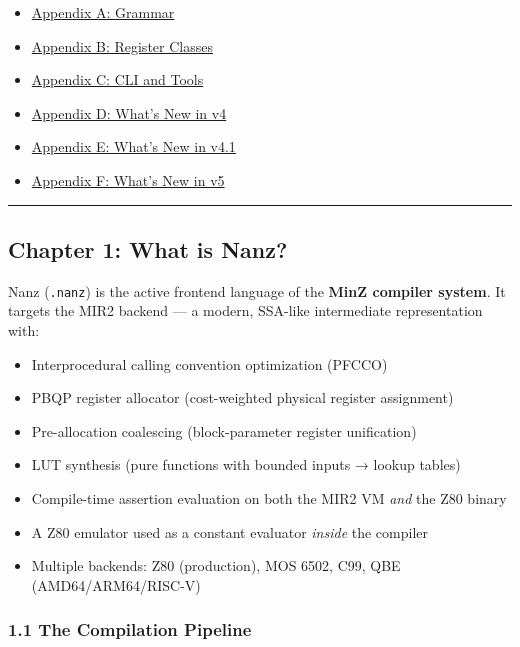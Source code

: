 \documentclass[
  11pt,
]{article}
\providecommand{\tightlist}{%
  \setlength{\itemsep}{0pt}\setlength{\parskip}{0pt}}
\begin{document}
\begin{itemize}
\tightlist
\item
  \protect\hyperlink{appendix-a-grammar}{Appendix A: Grammar}
\item
  \protect\hyperlink{appendix-b-register-classes}{Appendix B: Register
  Classes}
\item
  \protect\hyperlink{appendix-c-cli-and-tools}{Appendix C: CLI and
  Tools}
\item
  \protect\hyperlink{appendix-d-whats-new-in-v4}{Appendix D: What's New
  in v4}
\item
  \protect\hyperlink{appendix-e-whats-new-in-v41}{Appendix E: What's New
  in v4.1}
\item
  \protect\hyperlink{appendix-f-whats-new-in-v5}{Appendix F: What's New
  in v5}
\end{itemize}

\begin{center}\rule{0.5\linewidth}{0.5pt}\end{center}

\hypertarget{chapter-1-what-is-nanz}{%
\subsection{Chapter 1: What is Nanz?}\label{chapter-1-what-is-nanz}}

Nanz (\texttt{.nanz}) is the active frontend language of the
\textbf{MinZ compiler system}. It targets the MIR2 backend --- a modern,
SSA-like intermediate representation with:

\begin{itemize}
\tightlist
\item
  Interprocedural calling convention optimization (PFCCO)
\item
  PBQP register allocator (cost-weighted physical register assignment)
\item
  Pre-allocation coalescing (block-parameter register unification)
\item
  LUT synthesis (pure functions with bounded inputs → lookup tables)
\item
  Compile-time assertion evaluation on both the MIR2 VM \emph{and} the
  Z80 binary
\item
  A Z80 emulator used as a constant evaluator \emph{inside} the compiler
\item
  Multiple backends: Z80 (production), MOS 6502, C99, QBE
  (AMD64/ARM64/RISC-V)
\end{itemize}

\hypertarget{the-compilation-pipeline}{%
\subsubsection{1.1 The Compilation
Pipeline}\label{the-compilation-pipeline}}
\end{document}
